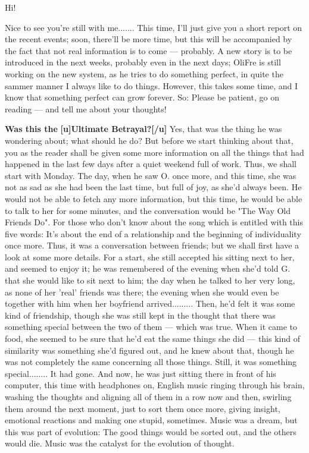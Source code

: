 Hi!

Nice to see you're still with me.......
This time, I'll just give you a short report on the recent events; soon, there'll be more time, but this will be accompanied by the fact that not real information is to come --- probably. A new story is to be introduced in the next weeks, probably even in the next days; OliFre is still working on the new system, as he tries to do something perfect, in quite the sammer manner I always like to do things. However, this takes some time, and I know that something perfect can grow forever. 
So: Please be patient, go on reading --- and tell me about your thoughts!

\textbf{Was this the}
\textbf{[u]Ultimate Betrayal?[/u]}
Yes, that was the thing he was wondering about; what should he do?
But before we start thinking about that, you as the reader shall be given some more information on all the things that had happened in the last few days after a quiet weekend full of work. 
Thus, we shall start with Monday. 
The day, when he saw O. once more, and this time, she was not as sad as she had been the last time, but full of joy, as she'd always been. He would not be able to fetch any more information, but this time, he would be able to talk to her for some minutes, and the conversation would be "The Way Old Friends Do". For those who don't know about the song which is entitled with this five words: It's about the end of a relationship and the beginning of individuality once more. Thus, it was a conversation between friends; but we shall first have a look at some more details. For a start, she still accepted his sitting next to her, and seemed to enjoy it; he was remembered of the evening when she'd told G. that she would like to sit next to him; the day when he talked to her very long, as none of her 'real' friends was there; the evening when she would even be together with him when her boyfriend arrived.........
Then, he'd felt it was some kind of friendship, though she was still kept in the thought that there was something special between the two of them --- which was true. When it came to food, she seemed to be sure that he'd eat the same things she did --- this kind of similarity was something she'd figured out, and he knew about that, though he was not completely the same concerning all those things. Still, it was something special........
It had gone. And now, he was just sitting there in front of his computer, this time with headphones on, English music ringing through his brain, washing the thoughts and aligning all of them in a row now and then, swirling them around the next moment, just to sort them once more, giving insight, emotional reactions and making one stupid, sometimes. Music was a dream, but this was part of evolution: The good things would be sorted out, and the others would die. Music was the catalyst for the evolution of thought. 
